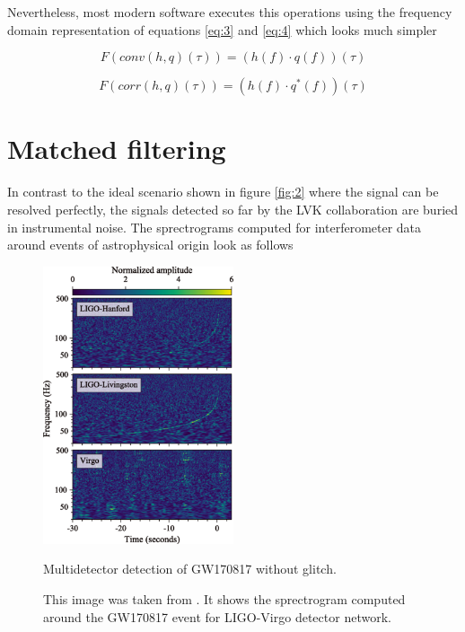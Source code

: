 \FloatBarrier


Nevertheless, most modern software executes this operations using the frequency domain representation of equations \ref{eq:3} and \ref{eq:4} which looks much simpler

\begin{equation}\label{eq:5}
F \left(conv(h,q)(\tau) \right)= \left( h(f) \cdot q(f) \right)(\tau)
\end{equation}


\begin{equation}\label{eq:6}
F \left( corr(h,q)(\tau) \right)= \left( h(f) \cdot q^*(f) \right) (\tau)
\end{equation}




\newpage

\section{Matched filtering}

In contrast to the ideal scenario shown in figure \ref{fig:2} where the signal can be resolved perfectly, the signals detected so far by the LVK collaboration \cite{LIGOScientific:2021djp} are buried in instrumental noise. The sprectrograms computed for interferometer data around events of astrophysical origin look as follows 

\begin{figure}[hbt!]
\begin{center}
\includegraphics[width=0.5\textwidth, angle=0]{images/170817mult.png}
\captionsetup{width=0.8\textwidth}
\caption{Multidetector detection of GW170817 without glitch.}
\caption*{This image was taken from \cite{LIGOScientific:2017vwq}. It shows the sprectrogram computed around the GW170817 event for LIGO-Virgo detector network.}
\label{ofeijf}
\end{center}

\end{figure}

